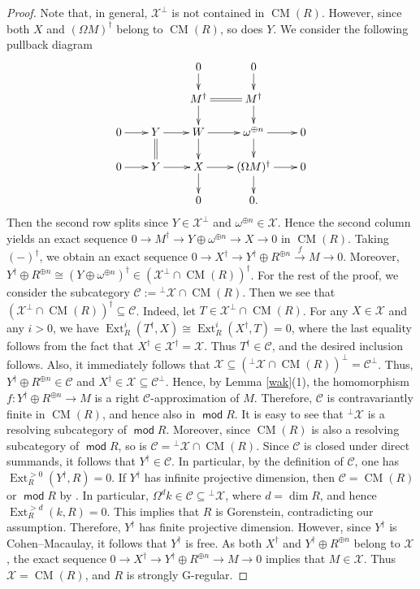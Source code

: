 \documentclass{amsart}
\theoremstyle{definition}
\theoremstyle{remark}
\numberwithin{equation}{thm}
\def\C{\mathcal{C}}
\def\cm{\operatorname{CM}}
\def\Ext{\operatorname{Ext}}
\def\mod{\operatorname{\mathsf{mod}}}
\def\X{\mathcal{X}}
\begin{document}
\begin{proof}
Note that, in general, $\X^\perp$ is not contained in $\cm(R)$. However, since both $X$ and $(\Omega M)^\dagger$ belong to $\cm(R)$, so does $Y$.
We consider the following pullback diagram
\enlargethispage*{3\baselineskip}
$$
\xymatrix@C=2em@R=1.5em{
&&0\ar[d]&0\ar[d]&\\
&&M^\dagger\ar[d]\ar@{=}[r]&M^\dagger\ar[d]&\\
0\ar[r]&Y\ar@{=}[d]\ar[r]&W\ar[d]\ar[r]&\omega^{\oplus n}\ar[d]\ar[r]&0\\
0\ar[r]&Y\ar[r]&X\ar[d]\ar[r]&(\Omega M)^\dagger\ar[d]\ar[r]&0\\
&&0&0.&
}
$$
Then the second row splits since $Y\in\X^\perp$ and $\omega^{\oplus n}\in\X$.
Hence the second column yields an exact sequence $0\to M^\dagger\to Y\oplus\omega^{\oplus n}\to X\to 0$ in $\cm(R)$.
Taking $(-)^\dagger$, we obtain an exact sequence $0\to X^\dagger\to Y^\dagger\oplus R^{\oplus n}\xrightarrow{f}M\to0$.
Moreover, $Y^\dagger\oplus R^{\oplus n}\cong (Y\oplus\omega^{\oplus n})^\dagger\in(\X^\perp\cap\cm(R))^\dagger$.
For the rest of the proof, we consider the subcategory $\C:={}^{\perp}\X\cap\cm(R)$.
Then we see that $(\X^\perp\cap\cm(R))^\dagger\subseteq\C$.
Indeed, let $T\in\X^\perp\cap\cm(R)$.
For any $X\in\X$ and any $i>0$, we have $\Ext_R^i(T^\dagger,X)\cong\Ext_R^i(X^\dagger,T)=0$, where the last equality follows from the fact that $X^\dagger\in\X^\dagger=\X$.
Thus $T^\dagger\in\C$, and the desired inclusion follows.
Also, it immediately follows that $\X\subseteq({}^{\perp}\X\cap\cm(R))^\perp=\C^\perp$.
Thus, $Y^\dagger\oplus R^{\oplus n}\in\C$ and $X^\dagger\in\X\subseteq\C^\perp$.
Hence, by Lemma \ref{wak}(1), the homomorphism $f:Y^\dagger\oplus R^{\oplus n}\to M$ is a right $\C$-approximation of $M$.
Therefore, $\C$ is contravariantly finite in $\cm(R)$, and hence also in $\mod R$.
It is easy to see that ${}^{\perp}\X$ is a resolving subcategory of $\mod R$.
Moreover, since $\cm(R)$ is also a resolving subcategory of $\mod R$, so is $\C={}^{\perp}\X\cap\cm(R)$.
Since $\C$ is closed under direct summands, it follows that $Y^\dagger\in\C$.
In particular, by the definition of $\C$, one has $\Ext_R^{>0}(Y^\dagger,R)=0$.
If $Y^\dagger$ has infinite projective dimension, then $\C=\cm(R)$ or $\mod R$ by \cite[Theorem 1.4]{T11}.
In particular, $\Omega^d k\in\C\subseteq{}^{\perp}\X$, where $d=\dim R$, and hence $\Ext_R^{>d}(k,R)=0$.
This implies that $R$ is Gorenstein, contradicting our assumption.
Therefore, $Y^\dagger$ has finite projective dimension.
However, since $Y^\dagger$ is Cohen--Macaulay, it follows that $Y^\dagger$ is free.
As both $X^\dagger$ and $Y^\dagger\oplus R^{\oplus n}$ belong to $\X$, the exact sequence $0\to X^\dagger\to Y^\dagger\oplus R^{\oplus n}\to M\to0$ implies that $M\in\X$.
Thus $\X=\cm(R)$, and $R$ is strongly G-regular.
\end{proof}
\end{document}
